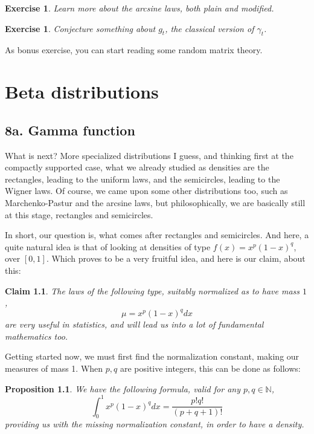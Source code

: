 \documentclass[12pt]{amsbook}
\newtheorem{claim}[theorem]{Claim}
\newtheorem{exercise}[theorem]{Exercise}
\newtheorem{proposition}[theorem]{Proposition}
\begin{document}
\begin{exercise}
Learn more about the arcsine laws, both plain and modified.
\end{exercise}

\begin{exercise}
Conjecture something about $g_t$, the classical version of $\gamma_t$.
\end{exercise}

As bonus exercise, you can start reading some random matrix theory.

\chapter{Beta distributions}

\section*{8a. Gamma function}

What is next? More specialized distributions I guess, and thinking first at the compactly supported case, what we already studied as densities are the rectangles, leading to the uniform laws, and the semicircles, leading to the Wigner laws. Of course, we came upon some other distributions too, such as Marchenko-Pastur and the arcsine laws, but philosophically, we are basically still at this stage, rectangles and semicircles.

\bigskip

In short, our question is, what comes after rectangles and semicircles. And here, a quite natural idea is that of looking at densities of type $f(x)=x^p(1-x)^q$, over $[0,1]$. Which proves to be a very fruitful idea, and here is our claim, about this:

\begin{claim}
The laws of the following type, suitably normalized as to have mass $1$,
$$\mu=x^p(1-x)^qdx$$ 
are very useful in statistics, and will lead us into a lot of fundamental mathematics too.
\end{claim} 

Getting started now, we must first find the normalization constant, making our measures of mass 1. When $p,q$ are positive integers, this can be done as follows:

\begin{proposition}
We have the following formula, valid for any $p,q\in\mathbb N$,
$$\int_0^1x^p(1-x)^qdx=\frac{p!q!}{(p+q+1)!}$$
providing us with the missing normalization constant, in order to have a density.
\end{proposition}
\end{document}
